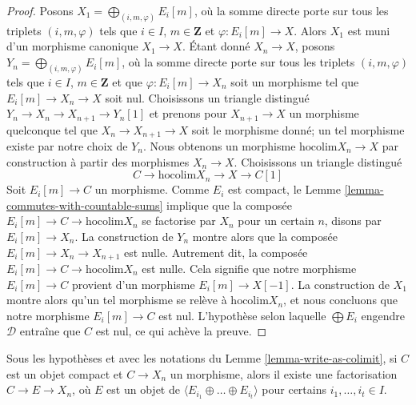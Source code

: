 \begin{proof}
Posons $X_1 = \bigoplus_{(i, m, \varphi)} E_i[m]$, où la somme directe porte
sur tous les triplets $(i, m, \varphi)$ tels que $i \in I$,
$m \in \mathbf{Z}$ et $\varphi : E_i[m] \to X$. Alors $X_1$ est muni d'un
morphisme canonique $X_1 \to X$. Étant donné $X_n \to X$, posons
$Y_n = \bigoplus_{(i, m, \varphi)} E_i[m]$, où la somme directe porte sur tous
les triplets $(i, m, \varphi)$ tels que $i \in I$, $m \in \mathbf{Z}$ et que
$\varphi : E_i[m] \to X_n$ soit un morphisme tel que
$E_i[m] \to X_n \to X$ soit nul. Choisissons un triangle distingué
$Y_n \to X_n \to X_{n + 1} \to Y_n[1]$ et prenons pour
$X_{n + 1} \to X$ un morphisme quelconque tel que
$X_n \to X_{n + 1} \to X$ soit le morphisme donné; un tel morphisme existe par
notre choix de $Y_n$.
Nous obtenons un morphisme $\text{hocolim} X_n \to X$ par construction à
partir des morphismes $X_n \to X$. Choisissons un triangle distingué
$$
C \to \text{hocolim} X_n \to X \to C[1]
$$
Soit $E_i[m] \to C$ un morphisme. Comme $E_i$ est compact, le
Lemme \ref{lemma-commutes-with-countable-sums} implique que la composée
$E_i[m] \to C \to \text{hocolim} X_n$ se factorise par $X_n$ pour un certain
$n$, disons par $E_i[m] \to X_n$. La construction de $Y_n$ montre alors que
la composée $E_i[m] \to X_n \to X_{n + 1}$ est nulle. Autrement dit, la
composée $E_i[m] \to C \to \text{hocolim} X_n$ est nulle. Cela signifie que
notre morphisme $E_i[m] \to C$ provient d'un morphisme
$E_i[m] \to X[-1]$. La construction de $X_1$ montre alors qu'un tel morphisme
se relève à $\text{hocolim} X_n$, et nous concluons que notre morphisme
$E_i[m] \to C$ est nul. L'hypothèse selon laquelle $\bigoplus E_i$ engendre
$\mathcal{D}$ entraîne que $C$ est nul, ce qui achève la preuve.
\end{proof}

\begin{lemma}
\label{lemma-factor-through}
Sous les hypothèses et avec les notations du
Lemme \ref{lemma-write-as-colimit}, si $C$ est un objet compact et
$C \to X_n$ un morphisme, alors il existe une factorisation
$C \to E \to X_n$, où $E$ est un objet de
$\langle E_{i_1} \oplus \ldots \oplus E_{i_t} \rangle$ pour certains
$i_1, \ldots, i_t \in I$.
\end{lemma}

